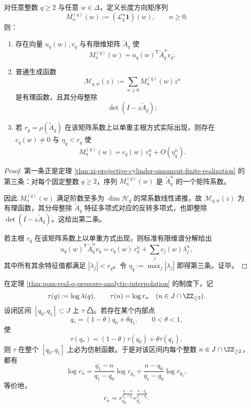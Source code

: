 \begin{theorem}\label{thm:derived-projective-length-direction-rational-cfinite}
对任意整数 \(q\ge 2\) 与任意 \(w\in\Delta\)，定义长度方向矩序列
\[
M_n^{(q)}(w):=(\mathcal L_q^n\mathbf 1)(w),
\qquad n\ge 0.
\]
则：
\begin{enumerate}
\normalfont
  \item 存在向量 \(u_q(w),v_q\) 与有限维矩阵 \(\widetilde A_q\) 使
  \[
  M_n^{(q)}(w)=u_q(w)^{\mathsf T}\widetilde A_q^n v_q;
  \]
  \item 普通生成函数
  \[
  \mathcal M_{q,w}(z):=\sum_{n\ge 0}M_n^{(q)}(w)z^n
  \]
  是有理函数，且其分母整除
  \[
  \det(I-z\widetilde A_q);
  \]
  \item 若 \(r_q=\rho(\widetilde A_q)\) 在该矩阵系数上以单重主根方式实际出现，则存在 \(c_q(w)\neq 0\) 与 \(\eta_q<r_q\) 使
  \[
  M_n^{(q)}(w)=c_q(w)\,r_q^n+O(\eta_q^n).
  \]
\end{enumerate}
\end{theorem}

\begin{proof}
第一条正是定理 \ref{thm:xi-projective-cylinder-qmoment-finite-realization} 的第三条：对每个固定整数 \(q\ge 2\)，序列 \(M_n^{(q)}(w)\) 是 \(\widetilde A_q^n\) 的一个矩阵系数。

因此 \(M_n^{(q)}(w)\) 满足阶数至多为 \(\dim\mathcal H_q\) 的常系数线性递推，故 \(\mathcal M_{q,w}(z)\) 为有理函数，其分母整除 \(\widetilde A_q\) 特征多项式对应的反转多项式，也即整除 \(\det(I-z\widetilde A_q)\)。这给出第二条。

若主根 \(r_q\) 在该矩阵系数上以单重方式出现，则标准有限维谱分解给出
\[
u_q(w)^{\mathsf T}\widetilde A_q^n v_q
=
c_q(w)\,r_q^n+\sum_j c_j(w)\lambda_j^n,
\]
其中所有其余特征值都满足 \(|\lambda_j|<r_q\)。令 \(\eta_q:=\max_j|\lambda_j|\) 即得第三条。证毕。
\end{proof}

\begin{theorem}\label{thm:derived-projective-pressure-secant-rigidity}
在定理 \ref{thm:pom-real-q-pressure-analytic-interpolation} 的制度下，记
\[
\tau(q):=\log\lambda(q),
\qquad
\tau(n)=\log r_n
\quad (n\in J\cap\ZZ_{\ge 2}).
\]
设闭区间 \([q_0,q_1]\subset J\) 上 \(\tau\) 凸。若存在某个内部点
\[
q_\ast=(1-\theta)q_0+\theta q_1,
\qquad
0<\theta<1,
\]
使
\[
\tau(q_\ast)=(1-\theta)\tau(q_0)+\theta\tau(q_1),
\]
则 \(\tau\) 在整个 \([q_0,q_1]\) 上必为仿射函数。于是对该区间内每个整数 \(n\in J\cap\ZZ_{\ge 2}\)，都有
\[
\log r_n
=
\frac{q_1-n}{q_1-q_0}\log r_{q_0}
+
\frac{n-q_0}{q_1-q_0}\log r_{q_1},
\]
等价地，
\[
r_n
=
r_{q_0}^{\frac{q_1-n}{q_1-q_0}}
r_{q_1}^{\frac{n-q_0}{q_1-q_0}}.
\]
\end{theorem}

